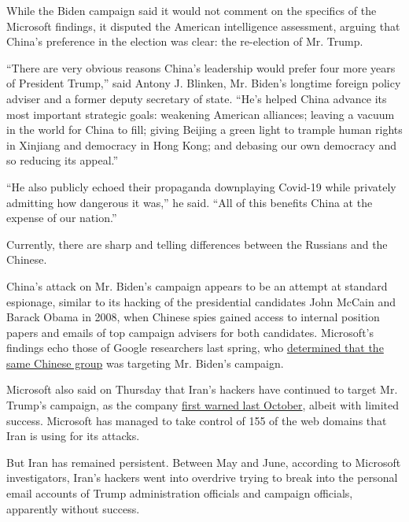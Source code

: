 While the Biden campaign said it would not comment on the specifics of
the Microsoft findings, it disputed the American intelligence
assessment, arguing that China's preference in the election was clear:
the re-election of Mr. Trump.

``There are very obvious reasons China's leadership would prefer four
more years of President Trump,'' said Antony J. Blinken, Mr. Biden's
longtime foreign policy adviser and a former deputy secretary of state.
``He's helped China advance its most important strategic goals:
weakening American alliances; leaving a vacuum in the world for China to
fill; giving Beijing a green light to trample human rights in Xinjiang
and democracy in Hong Kong; and debasing our own democracy and so
reducing its appeal.''

``He also publicly echoed their propaganda downplaying Covid-19 while
privately admitting how dangerous it was,'' he said. ``All of this
benefits China at the expense of our nation.''

Currently, there are sharp and telling differences between the Russians
and the Chinese.

China's attack on Mr. Biden's campaign appears to be an attempt at
standard espionage, similar to its hacking of the presidential
candidates John McCain and Barack Obama in 2008, when Chinese spies
gained access to internal position papers and emails of top campaign
advisers for both candidates. Microsoft's findings echo those of Google
researchers last spring, who
\href{https://twitter.com/ShaneHuntley/status/1268589219842109440?ref_src=twsrc\%5Etfw\%7Ctwcamp\%5Etweetembed\%7Ctwterm\%5E1268589219842109440\%7Ctwgr\%5Eshare_3\&ref_url=https\%3A\%2F\%2Ftechcrunch.com\%2F2020\%2F06\%2F04\%2Fgoogle-china-iran-trump-biden\%2F}{determined
that the same Chinese group} was targeting Mr. Biden's campaign.

Microsoft also said on Thursday that Iran's hackers have continued to
target Mr. Trump's campaign, as the company
\href{https://www.nytimes3xbfgragh.onion/2019/10/04/technology/iranian-campaign-hackers-microsoft.html}{first
warned last October}, albeit with limited success. Microsoft has managed
to take control of 155 of the web domains that Iran is using for its
attacks.

But Iran has remained persistent. Between May and June, according to
Microsoft investigators, Iran's hackers went into overdrive trying to
break into the personal email accounts of Trump administration officials
and campaign officials, apparently without success.

